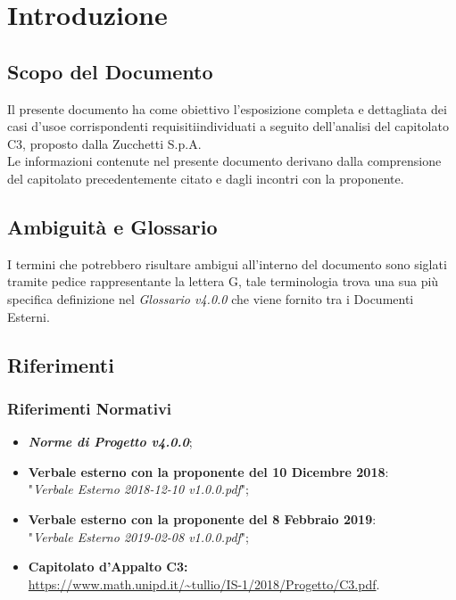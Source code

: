 \section{Introduzione}\label{Intro}

\subsection{Scopo del Documento}
Il presente documento ha come obiettivo l'esposizione completa e dettagliata dei casi d'uso\glossario e corrispondenti requisiti\glossario individuati a seguito dell'analisi del capitolato C3, proposto dalla Zucchetti S.p.A.\\
Le informazioni contenute nel presente documento derivano dalla comprensione del capitolato precedentemente citato e dagli incontri con la proponente.

\subsection{Ambiguità e Glossario}
I termini che potrebbero risultare ambigui all'interno del documento sono siglati tramite pedice rappresentante la lettera \textmd{G}, tale terminologia trova una sua più specifica definizione nel \textit{Glossario v4.0.0} che viene fornito tra i Documenti Esterni.

\subsection{Riferimenti}\label{Riferimenti}
\subsubsection{Riferimenti Normativi}
\label{RN}
\begin{itemize}
\item \textbf{\textit{Norme di Progetto v4.0.0}};
\item \textbf{Verbale esterno con la proponente del 10 Dicembre 2018}: \-\\ "\textit{Verbale Esterno 2018-12-10 v1.0.0.pdf}";
\item \textbf{Verbale esterno con la proponente del 8 Febbraio 2019}: \-\\ "\textit{Verbale Esterno 2019-02-08 v1.0.0.pdf}";
\item \textbf{Capitolato d'Appalto C3:}\\ \url{https://www.math.unipd.it/~tullio/IS-1/2018/Progetto/C3.pdf}.
\end{itemize}

